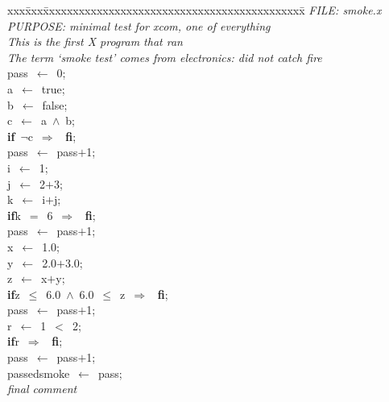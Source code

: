 \documentclass{report}
\begin{document}
\pagestyle{empty}
\begin{tabbing}
xxx\=xxx\=xxxxxxxxxxxxxxxxxxxxxxxxxxxxxxxxxxxxxxxxxxxx\=\kill
{\tt{}}{\em{} FILE:    smoke.x
}\\
{\tt{}}{\em{} PURPOSE: minimal test for xcom, one of everything
}\\
{\tt{}}{\em{}          This is the first X program that ran
}\\
{\tt{}}{\em{}          The term `smoke test' comes from electronics: did not catch fire
}\\
pass\ $\leftarrow$\ 0;\>\>\\
a\ $\leftarrow$\ true;\\
b\ $\leftarrow$\ false;\\
c\ $\leftarrow$\ a\ $\wedge$\ b;\\
{\bf if}\>\ $\neg$c\ $\Rightarrow$
\ {\bf {f}{i}};
\\
pass\ $\leftarrow$\ pass$+$1;\>\>\\
i\ $\leftarrow$\ 1;\\
j\ $\leftarrow$\ 2$+$3;\\
k\ $\leftarrow$\ i$+$j;\\
{\bf if}\>k\ $=$\ 6\ $\Rightarrow$
\ {\bf {f}{i}};
\\
pass\ $\leftarrow$\ pass$+$1;\>\>\\
x\ $\leftarrow$\ 1.0;\\
y\ $\leftarrow$\ 2.0$+$3.0;\\
z\ $\leftarrow$\ x$+$y;\\
{\bf if}\>z\ $\leq$\ 6.0\ $\wedge$\ 6.0\ $\leq$\ z\ $\Rightarrow$
\ {\bf {f}{i}};
\\
pass\ $\leftarrow$\ pass$+$1;\>\>\\
r\ $\leftarrow$\ 1\ $<$\ 2;\\
{\bf if}\>r\ $\Rightarrow$
\ {\bf {f}{i}};
\\
pass\ $\leftarrow$\ pass$+$1;\\
passedsmoke\ $\leftarrow$\ pass;\\
{\tt{}}{\em{} final comment
}\\
\end{tabbing}
\end{document}
